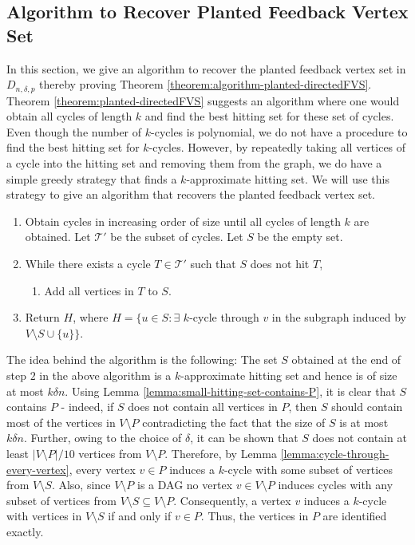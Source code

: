 \documentclass[11pt]{article}
\def\T{\mathcal{T}}
\begin{document}
\subsection{Algorithm to Recover Planted Feedback Vertex Set}
In this section, we give an algorithm to recover the planted feedback vertex set in $D_{n,\delta,p}$ thereby proving Theorem \ref{theorem:algorithm-planted-directedFVS}. Theorem \ref{theorem:planted-directedFVS} suggests an algorithm where one would obtain all cycles of length $k$ and find the best hitting set for these set of cycles. Even though the number of $k$-cycles is polynomial, we do not have a procedure to find the best hitting set for $k$-cycles. However, by repeatedly taking all vertices of a cycle into the hitting set and removing them from the graph, we do have a simple greedy strategy that finds a $k$-approximate hitting set. We will use this strategy to give an algorithm that recovers the planted feedback vertex set.

\begin{enumerate}
\item Obtain cycles in increasing order of size until all cycles of length $k$ are obtained. Let $\T'$ be the subset of cycles. Let $S$ be the empty set.
\item While there exists a cycle $T\in \T'$ such that $S$ does not hit $T$,
\begin{enumerate}
\item Add all vertices in $T$ to $S$.
\end{enumerate}
\item Return $H$, where $H=\{u\in S:\exists$ $k$-cycle through $v$ in the subgraph induced by $V\setminus S\cup\{u\}\}$.
\end{enumerate}

The idea behind the algorithm is the following: The set $S$ obtained at the end of step $2$ in the above algorithm is a $k$-approximate hitting set and hence is of size at most $k\delta n$. Using Lemma \ref{lemma:small-hitting-set-contains-P}, it is clear that $S$ contains $P$ - indeed, if $S$ does not contain all vertices in $P$, then $S$ should contain most of the vertices in $V\setminus P$ contradicting the fact that the size of $S$ is at most $k\delta n$. Further, owing to the choice of $\delta$, it can be shown that $S$ does not contain at least $|V\setminus P|/10$ vertices from $V\setminus P$.  Therefore, by Lemma \ref{lemma:cycle-through-every-vertex}, every vertex $v\in P$ induces a $k$-cycle with some subset of vertices from $V\setminus S$. Also, since $V\setminus P$ is a DAG no vertex $v\in V\setminus P$ induces cycles with any subset of vertices from $V\setminus S\subseteq V\setminus P$. Consequently, a vertex $v$ induces a $k$-cycle with vertices in $V\setminus S$ if and only if $v\in P$. Thus, the vertices in $P$ are identified exactly.
\end{document}
